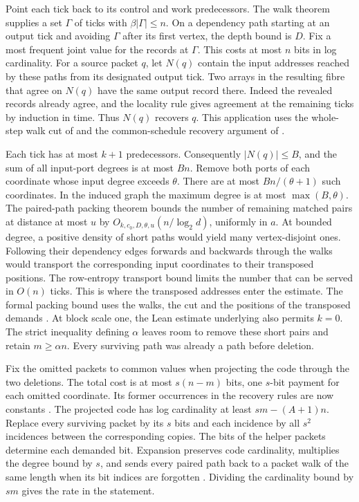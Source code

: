 \begin{outline}
Point each tick back to its control and work predecessors. The walk
theorem supplies a set $\Gamma$ of ticks with $\beta|\Gamma|\le n$.
On a dependency path starting at an output tick and avoiding $\Gamma$
after its first vertex, the depth bound is $D$.
Fix a most frequent joint value for the records at $\Gamma$. This
costs at most $n$ bits in log cardinality. For a source packet $q$, let
$N(q)$ contain the input addresses reached by these paths from its
designated output tick. Two arrays in the resulting fibre that agree on
$N(q)$ have the same output record there. Indeed the revealed records
already agree, and the locality rule gives agreement at the remaining
ticks by induction in time. Thus $N(q)$ recovers $q$. This application
uses the whole-step walk cut of \cite[Corollary~O(a)]{PaperFourteen} and
the common-schedule recovery argument of \cite[proof of Corollary~6.4]{PaperEight}.

Each tick has at most $k+1$ predecessors. Consequently $|N(q)|\le B$,
and the sum of all input-port degrees is at most $Bn$. Remove both ports
of each coordinate whose input degree exceeds $\theta$. There are at
most $Bn/(\theta+1)$ such coordinates. In the induced graph the maximum
degree is at most $\max(B,\theta)$. The paired-path packing theorem bounds
the number of remaining matched pairs at distance at most $u$ by
$O_{k,c_0,D,\theta,u}(n/\log_2 d)$, uniformly in $a$. At bounded degree, a positive density of short paths would yield many
vertex-disjoint ones. Following their dependency edges forwards and
backwards through the walks would transport the corresponding input
coordinates to their transposed positions. The row-entropy transport
bound limits the number that can be served in $O(n)$ ticks. This is
where the transposed addresses enter the estimate. The formal packing
bound uses the walks, the cut and the positions of the transposed demands
\cite[Theorem~3.3 and Remark~3.9]{PaperFive}. At block scale one, the Lean estimate
 underlying
\cite[Proposition~4.11(a)]{PaperEleven} also permits $k=0$. The strict inequality defining $\alpha$
leaves room to remove these short pairs and retain $m\ge\alpha n$.
Every surviving path was already a path before deletion.

Fix the omitted packets to common values when projecting the code through
the two deletions. The total cost is at most $s(n-m)$ bits, one $s$-bit
payment for each omitted coordinate. Its former occurrences in the
recovery rules are now constants \cite[Corollary~3.8]{PaperFive}. The
projected code has log cardinality at least $sm-(A+1)n$.
Replace every surviving packet by its $s$ bits and each incidence by
all $s^2$ incidences between the corresponding copies. The bits of the
helper packets determine each demanded bit. Expansion preserves code
cardinality, multiplies the degree bound by $s$, and sends every paired
path back to a packet walk of the same length when its bit indices are
forgotten \cite[Lemma~8.1]{PaperThirteen}. Dividing the cardinality
bound by $sm$ gives the rate in the statement.
\end{outline}

